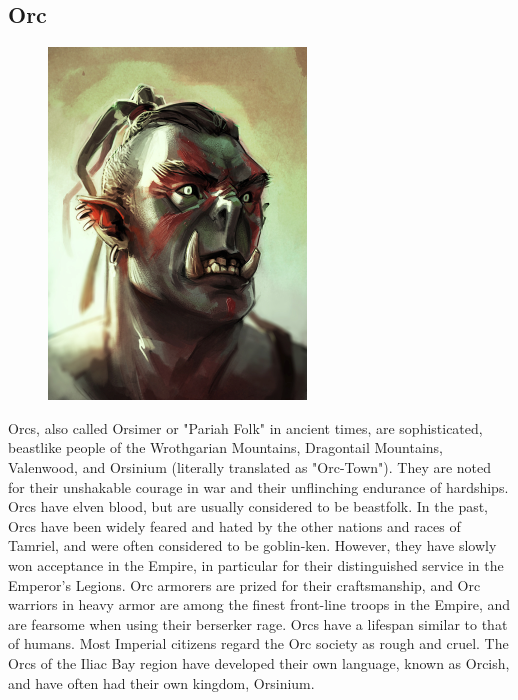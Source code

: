 \documentclass[12pt]{book}
\begin{document}
\subsection{Orc}
\begin{figure}
	\includegraphics[width=\textwidth]{Orc.png}
\end{figure}

Orcs, also called Orsimer or "Pariah Folk" in ancient times, are sophisticated, beastlike people of the Wrothgarian Mountains, Dragontail Mountains, Valenwood, and Orsinium (literally translated as "Orc-Town"). They are noted for their unshakable courage in war and their unflinching endurance of hardships. Orcs have elven blood, but are usually considered to be beastfolk. In the past, Orcs have been widely feared and hated by the other nations and races of Tamriel, and were often considered to be goblin-ken. However, they have slowly won acceptance in the Empire, in particular for their distinguished service in the Emperor's Legions. Orc armorers are prized for their craftsmanship, and Orc warriors in heavy armor are among the finest front-line troops in the Empire, and are fearsome when using their berserker rage. Orcs have a lifespan similar to that of humans. Most Imperial citizens regard the Orc society as rough and cruel. The Orcs of the Iliac Bay region have developed their own language, known as Orcish, and have often had their own kingdom, Orsinium.
\end{document}
